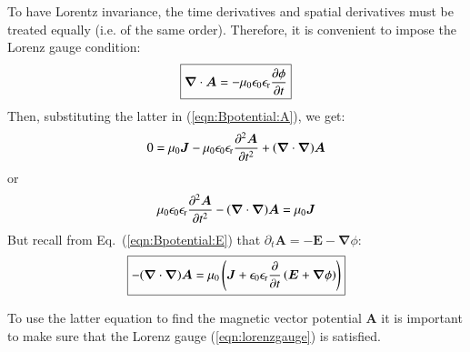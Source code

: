 \documentclass{warpdoc}
\newcommand\frameeqn[1]{\fbox{$\displaystyle #1$}}
\renewcommand{\vec}[1]{\bm{#1}}
\begin{document}
To have Lorentz invariance, the time derivatives and spatial derivatives must be treated equally (i.e. of the same order). Therefore, it is convenient to impose the Lorenz gauge condition:
%
\begin{equation}
\frameeqn{
\vec{\nabla}\cdot\vec{A}=-\mu_0\epsilon_0 \epsilon_{\rm r}  \frac{\partial \phi}{\partial t}
}
\label{eqn:lorenzgauge}
\end{equation}
%
Then, substituting the latter in (\ref{eqn:Bpotential:A}), we get:
%
\begin{equation}
0  = \mu_0 \vec{J} - \mu_0 \epsilon_0 \epsilon_{\rm r}  \frac{\partial^2 \vec{A} }{\partial t^2} +   (\vec{\nabla}\cdot\vec{\nabla}) \vec{A}
\end{equation}
% 
or
%
\begin{equation}
 \mu_0 \epsilon_0 \epsilon_{\rm r} \frac{\partial^2 \vec{A} }{\partial t^2} -   (\vec{\nabla}\cdot\vec{\nabla}) \vec{A}  = \mu_0 \vec{J} 
\end{equation}
% 
But recall from Eq.~(\ref{eqn:Bpotential:E}) that $\partial_t \vec{A} = -\vec{E}-\vec{\nabla}\phi$:
%
\begin{equation}
\frameeqn{
  -   (\vec{\nabla}\cdot\vec{\nabla}) \vec{A}  = \mu_0 \left(\vec{J} +\epsilon_0 \epsilon_{\rm r} \frac{\partial }{\partial t}\left( \vec{E}+\vec{\nabla}\phi \right)\right)
 }
\label{eqn:Bpotential:A:Lorenz}
\end{equation}
% 


To use the latter equation to find the magnetic vector potential $\vec{A}$ it is important to make sure that the Lorenz gauge (\ref{eqn:lorenzgauge}) is satisfied.
\end{document}
